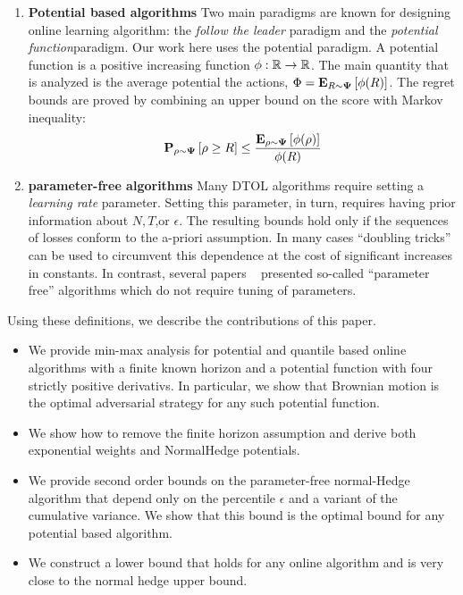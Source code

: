 \documentclass{article}[12pt]
\begin{document}
\begin{enumerate}
  
\item {\bf Potential based algorithms} Two main paradigms are known
  for designing online learning algorithm: the {\em follow the leader}
  paradigm and the {\em potential function}paradigm.  Our work here 
  uses the potential paradigm. A potential function is a positive increasing function
  $\phi:\mathbb{R} \to \mathbb{R}$. The main quantity that is analyzed is the
  average potential the actions,
  $\Phi = {\bf E}_{R \sim {\bf \Psi}}\left[ \phi(R) \right]$. The regret bounds are
  proved by combining an upper bound on the score with Markov
  inequality:
  \[
    {\bf P}_{\rho \sim {\bf \Psi}}\left[ \rho \geq R \right] \leq \frac{{\bf E}_{\rho \sim {\bf \Psi}}\left[ \phi(\rho) \right]}{\phi(R)}
  \]

\item {\bf parameter-free algorithms} Many DTOL algorithms require
  setting a {\em learning rate} parameter. Setting this parameter, in
  turn, requires having prior information about $N,T$,or
  $\epsilon$. The resulting bounds hold only if the sequences of
  losses conform to the a-priori assumption. In many cases ``doubling
  tricks'' can be used to circumvent this dependence at the cost of
  significant increases in constants. In contrast, several papers
  ~\cite{chaudhuri2009parameter,orabona2016coin,cutkosky2018black,luo2015achieving}
  presented so-called ``parameter free'' algorithms which do not
  require tuning of parameters.
  
\end{enumerate}

Using these definitions, we describe the contributions of this paper.
\begin{itemize}
\item We provide min-max analysis for potential and quantile based online
  algorithms with a finite known horizon and a potential function with
  four strictly positive derivativs. In particular, we show that
  Brownian motion is the optimal adversarial strategy for any such
  potential function.
\item We show how to remove the finite horizon assumption and derive
  both exponential weights and NormalHedge potentials.
\item We provide second order bounds on the parameter-free normal-Hedge algorithm
  that depend only on the percentile $\epsilon$ and a variant of the cumulative
  variance. We show that this bound is the optimal bound for any
  potential based algorithm.
\item We construct a lower bound that holds for any online algorithm
  and is very close to the normal hedge upper bound.
\end{itemize}
\end{document}
